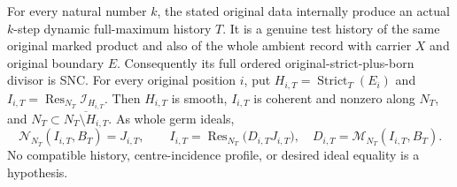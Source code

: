\begin{theorem}
\label{hir:sharp-actual-original-dynamic-full-boundary-prefix}
\leanok
For every natural number $k$, the stated original data internally produce
an actual $k$-step dynamic full-maximum history $T$.  It is a genuine test
history of the same original marked product and also of the whole ambient
record with carrier $X$ and original boundary $E$.  Consequently its full
ordered original-strict-plus-born divisor is SNC.  For every original
position $i$, put $H_{i,T}=\operatorname{Strict}_T(E_i)$ and
$I_{i,T}=\operatorname{Res}_{N_T}\mathcal I_{H_{i,T}}$.
Then $H_{i,T}$ is smooth, $I_{i,T}$ is coherent and nonzero along $N_T$,
and $N_T\subset\overline{N_T\setminus H_{i,T}}$.  As whole germ ideals,
\[
 \mathcal N_{N_T}(I_{i,T},B_T)=J_{i,T},\qquad
 I_{i,T}=\operatorname{Res}_{N_T}\bigl(D_{i,T}J_{i,T}\bigr),\quad
 D_{i,T}=\mathcal M_{N_T}(I_{i,T},B_T).
\]
No compatible history, centre-incidence profile, or desired ideal equality
is a hypothesis.
\end{theorem}
